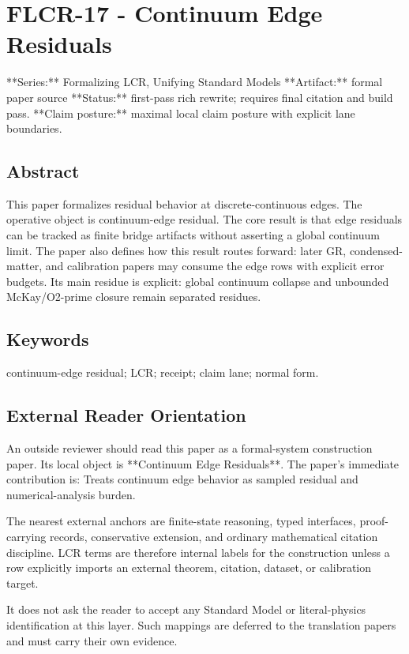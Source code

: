 \documentclass[11pt]{article}
\begin{document}
\section*{FLCR-17 - Continuum Edge Residuals}

**Series:** Formalizing LCR, Unifying Standard Models
**Artifact:** formal paper source
**Status:** first-pass rich rewrite; requires final citation and build pass.
**Claim posture:** maximal local claim posture with explicit lane boundaries.

\subsection*{Abstract}

This paper formalizes residual behavior at discrete-continuous edges. The operative object is continuum-edge residual. The core result is that edge residuals can be tracked as finite bridge artifacts without asserting a global continuum limit. The paper also defines how this result routes forward: later GR, condensed-matter, and calibration papers may consume the edge rows with explicit error budgets. Its main residue is explicit: global continuum collapse and unbounded McKay/O2-prime closure remain separated residues.

\subsection*{Keywords}

continuum-edge residual; LCR; receipt; claim lane; normal form.

\subsection*{External Reader Orientation}

An outside reviewer should read this paper as a formal-system construction paper. Its local object is **Continuum Edge Residuals**. The paper's immediate contribution is: Treats continuum edge behavior as sampled residual and numerical-analysis burden.

The nearest external anchors are finite-state reasoning, typed interfaces, proof-carrying records, conservative extension, and ordinary mathematical citation discipline. LCR terms are therefore internal labels for the construction unless a row explicitly imports an external theorem, citation, dataset, or calibration target.

It does not ask the reader to accept any Standard Model or literal-physics identification at this layer. Such mappings are deferred to the translation papers and must carry their own evidence.
\end{document}
